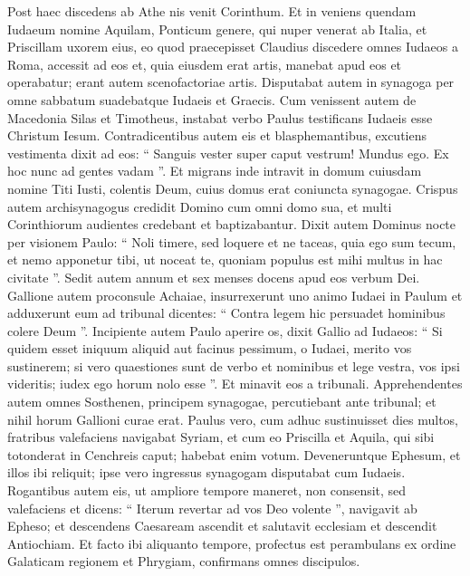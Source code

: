 \begin{biblechapter}
\begin{biblechapter}
\begin{biblechapter}
\begin{biblechapter}
\begin{biblechapter}
\begin{biblechapter}
\begin{biblechapter}
\begin{biblechapter}
\begin{biblechapter}
\begin{biblechapter}
\begin{biblechapter}
\begin{biblechapter}
\begin{biblechapter}
\begin{biblechapter}
\begin{biblechapter}
\begin{biblechapter}
\begin{biblechapter}
\begin{biblechapter}
\verse Post haec discedens ab Athe nis venit Corinthum. 
\verse Et in veniens quendam Iudaeum nomine Aquilam, Ponticum genere, qui nuper venerat ab Italia, et Priscillam uxorem eius, eo quod praecepisset Claudius discedere omnes Iudaeos a Roma, accessit ad eos 
\verse et, quia eiusdem erat artis, manebat apud eos et operabatur; erant autem scenofactoriae artis. 
\verse Disputabat autem in synagoga per omne sabbatum suadebatque Iudaeis et Graecis.
 \verse Cum venissent autem de Macedonia Silas et Timotheus, instabat verbo Paulus testificans Iudaeis esse Christum Iesum. 
\verse Contradicentibus autem eis et blasphemantibus, excutiens vestimenta dixit ad eos: “ Sanguis vester super caput vestrum! Mundus ego. Ex hoc nunc ad gentes vadam ”. 
\verse Et migrans inde intravit in domum cuiusdam nomine Titi Iusti, colentis Deum, cuius domus erat coniuncta synagogae. 
\verse Crispus autem archisynagogus credidit Domino cum omni domo sua, et multi Corinthiorum audientes credebant et baptizabantur.
 \verse Dixit autem Dominus nocte per visionem Paulo: “ Noli timere, sed loquere et ne taceas, 
\verse quia ego sum tecum, et nemo apponetur tibi, ut noceat te, quoniam populus est mihi multus in hac civitate ”.
 \verse Sedit autem annum et sex menses docens apud eos verbum Dei.
 \verse Gallione autem proconsule Achaiae, insurrexerunt uno animo Iudaei in Paulum et adduxerunt eum ad tribunal 
\verse dicentes: “ Contra legem hic persuadet hominibus colere Deum ”. 
\verse Incipiente autem Paulo aperire os, dixit Gallio ad Iudaeos: “ Si quidem esset iniquum aliquid aut facinus pessimum, o Iudaei, merito vos sustinerem; 
\verse si vero quaestiones sunt de verbo et nominibus et lege vestra, vos ipsi videritis; iudex ego horum nolo esse ”. 
\verse Et minavit eos a tribunali. 
\verse Apprehendentes autem omnes Sosthenen, principem synagogae, percutiebant ante tribunal; et nihil horum Gallioni curae erat.
 \verse Paulus vero, cum adhuc sustinuisset dies multos, fratribus valefaciens navigabat Syriam, et cum eo Priscilla et Aquila, qui sibi totonderat in Cenchreis caput; habebat enim votum. 
\verse Deveneruntque Ephesum, et illos ibi reliquit; ipse vero ingressus synagogam disputabat cum Iudaeis. 
\verse Rogantibus autem eis, ut ampliore tempore maneret, non consensit, 
\verse sed valefaciens et dicens: “ Iterum revertar ad vos Deo volente ”, navigavit ab Epheso; 
\verse et descendens Caesaream ascendit et salutavit ecclesiam et descendit Antiochiam.
 \verse Et facto ibi aliquanto tempore, profectus est perambulans ex ordine Galaticam regionem et Phrygiam, confirmans omnes discipulos.

\end{biblechapter}
\end{biblechapter}
\end{biblechapter}
\end{biblechapter}
\end{biblechapter}
\end{biblechapter}
\end{biblechapter}
\end{biblechapter}
\end{biblechapter}
\end{biblechapter}
\end{biblechapter}
\end{biblechapter}
\end{biblechapter}
\end{biblechapter}
\end{biblechapter}
\end{biblechapter}
\end{biblechapter}
\end{biblechapter}
